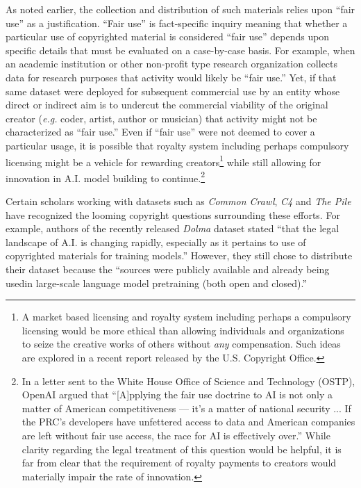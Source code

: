 As noted earlier, the collection and distribution of such materials relies upon ``fair use'' as a justification. ``Fair use'' is fact-specific inquiry meaning that whether a particular use of copyrighted material is considered ``fair use'' depends upon specific details that must be evaluated on a case-by-case basis.  For example, when an academic institution or other non-profit type research organization collects data for research purposes that activity would likely be ``fair use.''  Yet, if that same dataset were deployed for subsequent commercial use by an entity whose direct or indirect aim is to undercut the commercial viability of the original creator (\textit{e.g.} coder, artist, author or musician) that activity might not be characterized as ``fair use.''  Even if ``fair use'' were not deemed to cover a particular usage, it is possible that royalty system including perhaps compulsory licensing might be a vehicle for rewarding creators\footnote{A market based licensing and royalty system including perhaps a compulsory licensing would be more ethical than allowing individuals and organizations to seize the creative works of others without \textit{any} compensation. Such ideas are explored in a recent report released by the U.S. Copyright Office.\cite{Jaffe2025}} while still allowing for innovation in A.I. model building to continue.\footnote{In a letter sent to the White House Office of Science and Technology (OSTP), OpenAI argued that ``[A]pplying the fair use doctrine to AI is not only a matter of American competitiveness — it’s a matter of national security ... If the PRC’s developers have unfettered access to data and American companies are left without fair use access, the race for AI is effectively over.''\cite{OpenAI}  While clarity regarding the legal treatment of this question would be helpful, it is far from clear that the requirement of royalty payments to creators would materially impair the rate of innovation.}

Certain scholars working with datasets such as \textit{Common Crawl}, \textit{C4} and \textit{The Pile} have recognized the looming copyright questions surrounding these efforts.\cite{schafer2016commoncow}\cite{habernal2016c4corpus}  For example, authors of the recently released  \textit{Dolma} dataset stated ``that the legal landscape of A.I. is changing rapidly, especially as it pertains to use of copyrighted materials for training models.''\cite{soldaini-etal-2024-dolma}  However, they still chose to distribute their dataset because the ``sources were publicly available and already being usedin large-scale language model pretraining (both open and closed).'' 

